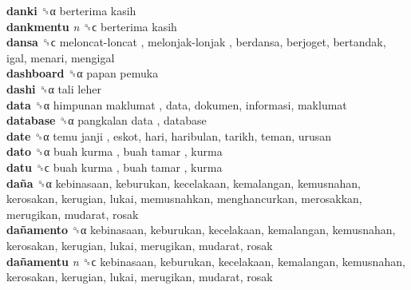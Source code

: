 \textbf{danki} ␝α   berterima kasih   \\
\textbf{dankmentu} \emph{n}  ␝ϲ   berterima kasih   \\
\textbf{dansa} ␝ϲ   meloncat-loncat ,  melonjak-lonjak , berdansa, berjoget, bertandak, igal, menari, mengigal  \\
\textbf{dashboard} ␝α   papan pemuka   \\
\textbf{dashi} ␝α   tali leher   \\
\textbf{data} ␝α   himpunan maklumat , data, dokumen, informasi, maklumat  \\
\textbf{database} ␝α   pangkalan data , database  \\
\textbf{date} ␝α   temu janji , eskot, hari, haribulan, tarikh, teman, urusan  \\
\textbf{dato} ␝α   buah kurma ,  buah tamar , kurma  \\
\textbf{datu} ␝ϲ   buah kurma ,  buah tamar , kurma  \\
\textbf{daña} ␝α  kebinasaan, keburukan, kecelakaan, kemalangan, kemusnahan, kerosakan, kerugian, lukai, memusnahkan, menghancurkan, merosakkan, merugikan, mudarat, rosak  \\
\textbf{dañamento} ␝α  kebinasaan, keburukan, kecelakaan, kemalangan, kemusnahan, kerosakan, kerugian, lukai, merugikan, mudarat, rosak  \\
\textbf{dañamentu} \emph{n}  ␝ϲ  kebinasaan, keburukan, kecelakaan, kemalangan, kemusnahan, kerosakan, kerugian, lukai, merugikan, mudarat, rosak  \\
